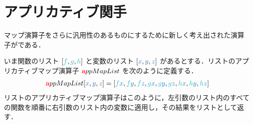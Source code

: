 \documentclass[a5paper,twoside,fleqn,draft]{jsbook}
\begin{document}





\section{アプリカティブ関手}

マップ演算子をさらに汎用性のあるものにするために新しく考え出された演算子がである．

いま関数のリスト $[\hFunc{f},\hFunc{g},\mHFunc]$ と変数のリスト $[\hVar{x},\hVar{y},\hVar{z}]$ があるとする．リストのアプリカティブマップ演算子 $\hTypeName{a}ppMapList$ を次のように定義する．
\begin{equation}
  [\hFunc{f},\hFunc{g},\mHFunc]\hTypeName{a}ppMapList[\hVar{x},\hVar{y},\hVar{z}]
  =[\hFunc{f}\hVar{x},\hFunc{f}\hVar{y},\hFunc{f}\hVar{z},\hFunc{g}\hVar{x},\hFunc{g}\hVar{y},\hFunc{g}\hVar{z},\mHFunc\hVar{x},\mHFunc\hVar{y},\mHFunc\hVar{z}]
\end{equation}
リストのアプリカティブマップ演算子はこのように，左引数のリスト内のすべての関数を順番に右引数のリスト内の変数に適用し，その結果をリストとして返す．
\end{document}
